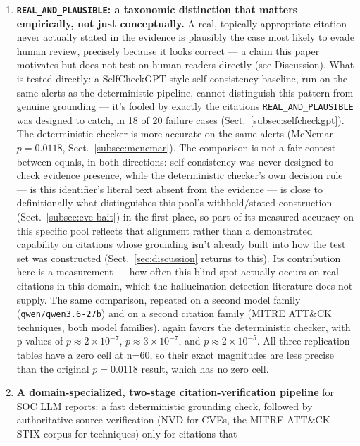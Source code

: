 \documentclass[pdflatex,sn-mathphys-num]{sn-jnl}%
\begin{document}
\begin{enumerate}
\item \textbf{\texttt{REAL\_AND\_PLAUSIBLE}: a taxonomic distinction that
   matters empirically, not just conceptually.} A real, topically
   appropriate citation never actually stated in the evidence is
   plausibly the case most likely to evade human review, precisely
   because it looks correct --- a claim this paper motivates but does
   not test on human readers directly (see Discussion). What is tested
   directly: a SelfCheckGPT-style self-consistency baseline, run on the
   same alerts as the deterministic pipeline, cannot distinguish this
   pattern from genuine grounding --- it's fooled by exactly the
   citations \texttt{REAL\_AND\_PLAUSIBLE} was designed to catch, in 18
   of 20 failure cases (Sect.~\ref{subsec:selfcheckgpt}). The
   deterministic checker is more accurate on the same alerts (McNemar
   $p=0.0118$, Sect.~\ref{subsec:mcnemar}). The comparison is not a
   fair contest between equals, in both directions: self-consistency was
   never designed to check evidence presence, while the deterministic
   checker's own decision rule --- is this identifier's literal text absent
   from the evidence --- is close to definitionally what distinguishes this
   pool's withheld/stated construction (Sect.~\ref{subsec:cve-bait}) in
   the first place, so part of its measured accuracy on this specific
   pool reflects that alignment rather than a demonstrated capability on
   citations whose grounding isn't already built into how the test set was
   constructed (Sect.~\ref{sec:discussion} returns to this). Its
   contribution here is a measurement --- how
   often this blind spot actually occurs on real citations in this domain,
   which the hallucination-detection literature does not supply. The same
   comparison, repeated on a second model family
   (\texttt{qwen/qwen3.6-27b}) and on a second citation family (MITRE
   ATT\&CK techniques, both model families), again favors the deterministic
   checker, with p-values of $p\approx2\times10^{-7}$, $p\approx3\times10^{-7}$,
   and $p\approx2\times10^{-5}$. All three replication tables have a zero
   cell at n=60, so their exact magnitudes are less precise than the
   original $p=0.0118$ result, which has no zero cell.
\item \textbf{A domain-specialized, two-stage citation-verification
   pipeline} for SOC LLM reports: a fast deterministic grounding check,
   followed by authoritative-source verification (NVD for CVEs, the
   MITRE ATT\&CK STIX corpus for techniques) only for citations that

\end{enumerate}
\end{document}
